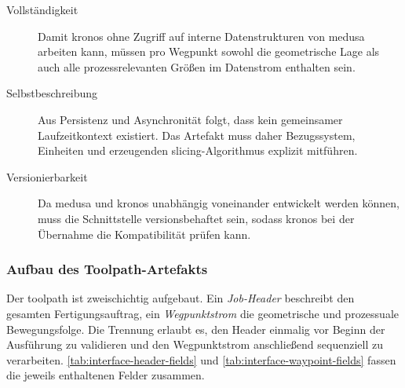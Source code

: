                 \begin{description}
                    \item[Vollständigkeit]
                        Damit \ac{kronos} ohne Zugriff auf interne Datenstrukturen von \ac{medusa} arbeiten kann, müssen pro Wegpunkt sowohl die geometrische Lage als auch alle prozessrelevanten Größen im Datenstrom enthalten sein.
                    \item[Selbstbeschreibung]
                        Aus Persistenz und Asynchronität folgt, dass kein gemeinsamer Laufzeitkontext existiert.
                        Das Artefakt muss daher Bezugssystem, Einheiten und erzeugenden \gls{slicing}-Algorithmus explizit mitführen.
                    \item[Versionierbarkeit]
                        Da \ac{medusa} und \ac{kronos} unabhängig voneinander entwickelt werden können, muss die Schnittstelle versionsbehaftet sein, sodass \ac{kronos} bei der Übernahme die Kompatibilität prüfen kann.
                \end{description}

            \subsubsection{Aufbau des Toolpath-Artefakts}\label{subsubsec:interface-conceptual-structure}
                Der \gls{toolpath} ist zweischichtig aufgebaut.
                Ein \emph{Job-Header} beschreibt den gesamten Fertigungsauftrag, ein \emph{Wegpunktstrom} die geometrische und prozessuale Bewegungsfolge.
                Die Trennung erlaubt es, den Header einmalig vor Beginn der Ausführung zu validieren und den Wegpunktstrom anschließend sequenziell zu verarbeiten.
                \cref{tab:interface-header-fields} und \cref{tab:interface-waypoint-fields} fassen die jeweils enthaltenen Felder zusammen.


